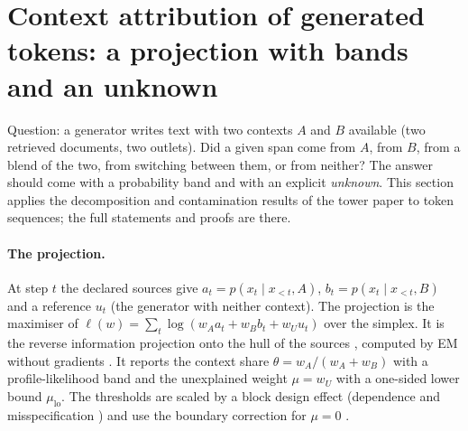 \documentclass[11pt]{article}
\theoremstyle{definition}
\theoremstyle{remark}
\begin{document}
\section{Context attribution of generated tokens: a projection with bands and an unknown}\label{sec:ctxattr}
Question: a generator writes text with two contexts $A$ and $B$ available (two retrieved documents, two outlets). Did a given span come from $A$, from $B$, from a blend of the two, from switching between them, or from neither? The answer should come with a probability band and with an explicit \emph{unknown}. This section applies the decomposition and contamination results of the tower paper \cite[Sections~5.2--5.4]{awasthiT} to token sequences; the full statements and proofs are there.

\paragraph{The projection.} At step $t$ the declared sources give $a_t=p(x_t\mid x_{<t},A)$, $b_t=p(x_t\mid x_{<t},B)$ and a reference $u_t$ (the generator with neither context). The projection is the maximiser of $\ell(w)=\sum_t\log(w_Aa_t+w_Bb_t+w_Uu_t)$ over the simplex. It is the reverse information projection onto the hull of the sources \cite{csiszar}, computed by EM without gradients \cite{dempster77,csiszartusnady84}. It reports the context share $\theta=w_A/(w_A+w_B)$ with a profile-likelihood band and the unexplained weight $\mu=w_U$ with a one-sided lower bound $\mu_{\mathrm{lo}}$. The thresholds are scaled by a block design effect (dependence and misspecification \cite{white82}) and use the boundary correction for $\mu=0$ \cite{chernoff54,selfliang87}.
\end{document}
